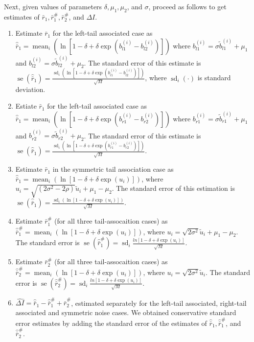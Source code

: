 \documentclass[letterpaper,11pt]{article}
\DeclareMathOperator{\mean}{mean}
\DeclareMathOperator{\se}{se}
\DeclareMathOperator{\sd}{sd}
\begin{document}
\noindent Next, given values of parameters $\delta, \mu_1, \mu_2$, and $\sigma$, proceed as follows to get estimates of $\bar r_1, \bar r_1^{\#}, \bar r_2^{\#}$, and $\Delta I$. 

\begin{enumerate}

\item Estimate $\bar r_1$ for the left-tail associated case as $\hat \bar r_1 = \mean_i (\ln [1-\delta+\delta\exp(b_{l1}^{(i)}-b_{l2}^{(i)})])$ where $b_{l1}^{(i)} = \sigma \tilde b_{l1}^{(i)} + \mu_1$ and $b_{l2}^{(i)} = \sigma \tilde b_{l2}^{(i)} + \mu_2$. The standard error of this estimate is $\se (\hat \bar r_1) =\frac{\sd _i (\ln[1-\delta +\delta \exp(b_{l1}^{(i)}-b_{l2}^{(i)})])}{\sqrt M}$, where $\sd _i(\cdot)$ is standard deviation. 

\item Estiate $\bar r_1$ for the left-tail associated case as $\hat \bar r_1 = \mean_i (\ln [1-\delta+\delta\exp(b_{r1}^{(i)}-b_{r2}^{(i)})])$ where $b_{r1}^{(i)} = \sigma \tilde b_{r1}^{(i)} + \mu_1$ and $b_{r2}^{(i)} = \sigma \tilde b_{r2}^{(i)} + \mu_2$. The standard error of this estimate is $\se (\hat \bar r_1) =\frac{\sd _i (\ln[1-\delta +\delta \exp(b_{r1}^{(i)}-b_{r2}^{(i)})])}{\sqrt M}$. 

\item Estimate $\bar r_1$ in the symmetric tail association case as $\hat \bar r_1=\mean_i(\ln[1-\delta+\delta \exp(u_i)])$, where $u_i = \sqrt{(2\sigma^2-2\rho)}\tilde u_i + \mu_1 - \mu_2$. The standard error of this estimation is $\se(\hat \bar r_1) = \frac {\sd_i(\ln[1-\delta+\delta \exp(u_i)])}{\sqrt M}$. 

\item Estimate $\bar r_1^{\#}$ (for all three tail-assocaition cases) as $\hat \bar r_1^{\#} = \mean_i(\ln[1-\delta+\delta \exp(u_i)])$, where $u_i = \sqrt{2\sigma^2}\tilde u_i + \mu_1 - \mu_2$. The standard error is $\se(\hat \bar r_1^{\#}) = \sd_i \frac{ln[1-\delta+\delta \exp(u_i)]}{\sqrt M}$.    

\item Estimate $\bar r_2^{\#}$ (for all three tail-assocaition cases) as $\hat \bar r_2^{\#} = \mean_i(\ln[1-\delta+\delta \exp(u_i)])$, where $u_i = \sqrt{2\sigma^2}\tilde u_i$. The standard error is $\se(\hat \bar r_2^{\#}) = \sd_i \frac{ln[1-\delta+\delta \exp(u_i)]}{\sqrt M}$.    

\item $\hat {\Delta I} = \hat \bar r_1 - \hat \bar r_1^{\#} + \hat \bar r_2^{\#}$, estimated separately for the left-tail associated, right-tail associated and symmetric noise cases. We obtained conservative standard error estimates by adding the standard error of the estimates of $\hat \bar r_1, \hat \bar r_1^{\#}$, and $\hat \bar r_2^{\#}$.

\end{enumerate}
\end{document}
